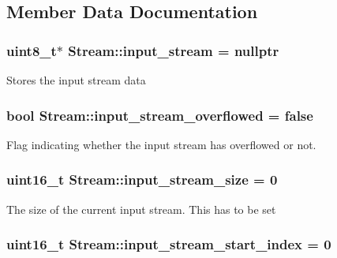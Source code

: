 \subsection{Member Data Documentation}
\hypertarget{class_stream_aaa6b266a85844345faee432d0267c6ec}{
\subsubsection[{input\-\_\-stream}]{\setlength{\rightskip}{0pt plus 5cm}uint8\-\_\-t$\ast$ Stream\-::input\-\_\-stream = nullptr\hspace{0.3cm}{\ttfamily [protected]}}}\label{class_stream_aaa6b266a85844345faee432d0267c6ec}
Stores the input stream data \hypertarget{class_stream_aeffd88d8ca71bf0d084ded2a251e3a57}{
\subsubsection[{input\-\_\-stream\-\_\-overflowed}]{\setlength{\rightskip}{0pt plus 5cm}bool Stream\-::input\-\_\-stream\-\_\-overflowed = false\hspace{0.3cm}{\ttfamily [protected]}}}\label{class_stream_aeffd88d8ca71bf0d084ded2a251e3a57}
Flag indicating whether the input stream has overflowed or not. \hypertarget{class_stream_a8a754b0acc9552d1b78de92b2476f4cb}{
\subsubsection[{input\-\_\-stream\-\_\-size}]{\setlength{\rightskip}{0pt plus 5cm}uint16\-\_\-t Stream\-::input\-\_\-stream\-\_\-size = 0\hspace{0.3cm}{\ttfamily [protected]}}}\label{class_stream_a8a754b0acc9552d1b78de92b2476f4cb}
The size of the current input stream. This has to be set \hypertarget{class_stream_ade2d5afb993214626e7c7d66cb76cd46}{
\subsubsection[{input\-\_\-stream\-\_\-start\-\_\-index}]{\setlength{\rightskip}{0pt plus 5cm}uint16\-\_\-t Stream\-::input\-\_\-stream\-\_\-start\-\_\-index = 0\hspace{0.3cm}{\ttfamily [protected]}}}\label{class_stream_ade2d5afb993214626e7c7d66cb76cd46}
